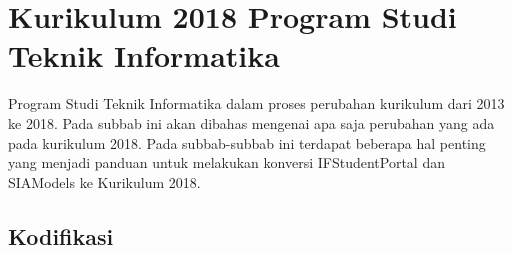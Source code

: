 \section{Kurikulum 2018 Program Studi Teknik Informatika}
\label{sec:kurikulum2018}

Program Studi Teknik Informatika dalam proses perubahan kurikulum dari 2013 ke 2018. Pada subbab ini akan dibahas mengenai apa saja perubahan yang ada pada kurikulum 2018. Pada subbab-subbab ini terdapat beberapa hal penting yang menjadi panduan untuk melakukan konversi IFStudentPortal dan SIAModels ke Kurikulum 2018.

\subsection{Kodifikasi}

